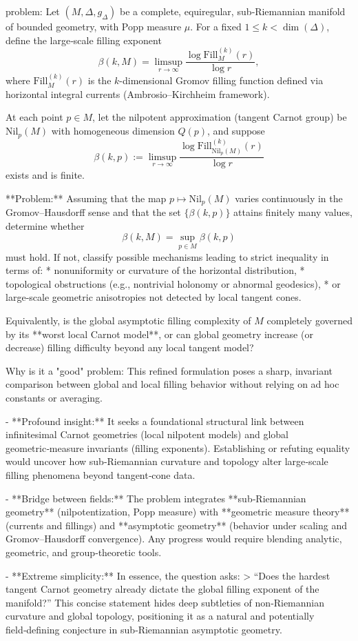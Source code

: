problem:  
Let \((M,\Delta,g_\Delta)\) be a complete, equiregular, sub‑Riemannian manifold of bounded geometry, with Popp measure \(\mu\).  
For a fixed \(1\le k<\dim(\Delta)\), define the large‑scale filling exponent
\[
\beta(k,M) = \limsup_{r\to\infty} \frac{\log \mathrm{Fill}_M^{(k)}(r)}{\log r},
\]
where \(\mathrm{Fill}_M^{(k)}(r)\) is the \(k\)-dimensional Gromov filling function defined via horizontal integral currents (Ambrosio–Kirchheim framework).

At each point \(p\in M\), let the nilpotent approximation (tangent Carnot group) be \(\mathrm{Nil}_p(M)\) with homogeneous dimension \(Q(p)\), and suppose  
\[
\beta(k,p):=\limsup_{r\to\infty}\frac{\log \mathrm{Fill}_{\mathrm{Nil}_p(M)}^{(k)}(r)}{\log r}
\]
exists and is finite.  

**Problem:**  
Assuming that the map \(p\mapsto \mathrm{Nil}_p(M)\) varies continuously in the Gromov–Hausdorff sense and that the set \(\{\beta(k,p)\}\) attains finitely many values, determine whether
\[
\beta(k,M) = \sup_{p\in M} \beta(k,p)
\]
must hold.  
If not, classify possible mechanisms leading to strict inequality in terms of:
* nonuniformity or curvature of the horizontal distribution,
* topological obstructions (e.g., nontrivial holonomy or abnormal geodesics),
* or large‑scale geometric anisotropies not detected by local tangent cones.

Equivalently, is the global asymptotic filling complexity of \(M\) completely governed by its **worst local Carnot model**, or can global geometry increase (or decrease) filling difficulty beyond any local tangent model?

Why is it a "good" problem:  
This refined formulation poses a sharp, invariant comparison between global and local filling behavior without relying on ad hoc constants or averaging.

- **Profound insight:**  
It seeks a foundational structural link between infinitesimal Carnot geometries (local nilpotent models) and global geometric‑measure invariants (filling exponents). Establishing or refuting equality would uncover how sub‑Riemannian curvature and topology alter large‑scale filling phenomena beyond tangent‑cone data.
  
- **Bridge between fields:**  
The problem integrates **sub‑Riemannian geometry** (nilpotentization, Popp measure) with **geometric measure theory** (currents and fillings) and **asymptotic geometry** (behavior under scaling and Gromov–Hausdorff convergence). Any progress would require blending analytic, geometric, and group‑theoretic tools.
  
- **Extreme simplicity:**  
In essence, the question asks:
> “Does the hardest tangent Carnot geometry already dictate the global filling exponent of the manifold?”
This concise statement hides deep subtleties of non‑Riemannian curvature and global topology, positioning it as a natural and potentially field‑defining conjecture in sub‑Riemannian asymptotic geometry.